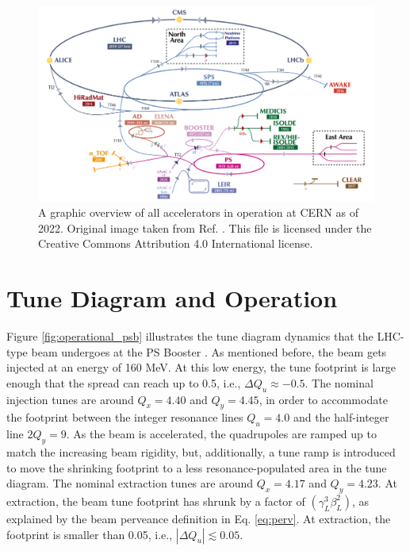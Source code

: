 \begin{figure}[H]
    \centering
    \includegraphics[width=\linewidth]{chapter5/CERN_AC.png}
    \caption{A graphic overview of all accelerators in operation at CERN as of 2022. Original image taken from Ref. \cite{cernplot}. This file is licensed under the Creative Commons Attribution 4.0 International license.}
    \label{fig:cernac}
\end{figure}

\section{Tune Diagram and Operation}

Figure \ref{fig:operational_psb} illustrates the tune diagram dynamics that the LHC-type beam undergoes at the PS Booster \cite{foteini1,foteini2,albright}. As mentioned before, the beam gets injected at an energy of 160 MeV. At this low energy, the tune footprint is large enough that the spread can reach up to 0.5, i.e., $\Delta Q_u \approx -0.5$. The nominal injection tunes are around $Q_x = 4.40$ and $Q_y = 4.45$, in order to accommodate the footprint between the integer resonance lines $Q_u= 4.0$ and the half-integer line $2Q_y=9$. As the beam is accelerated, the quadrupoles are ramped up to match the increasing beam rigidity, but, additionally, a tune ramp is introduced to move the shrinking footprint to a less resonance-populated area in the tune diagram. The nominal extraction tunes are around $Q_x = 4.17$ and $Q_y = 4.23$. At extraction, the beam tune footprint has shrunk by a factor of $(\gamma_L ^3 \beta_L ^2)$, as explained by the beam perveance definition in Eq. \ref{eq:perv}. At extraction, the footprint is smaller than 0.05, i.e., $| \Delta Q_u | \lesssim 0.05$.      

